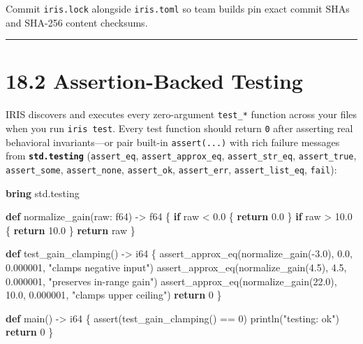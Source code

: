 \documentclass[
  english,
  oneside]{book}
\newenvironment{Shaded}{\begin{snugshade}}{\end{snugshade}}
\newcommand{\ControlFlowTok}[1]{\textcolor[rgb]{0.77,0.53,0.75}{\textbf{#1}}}
\newcommand{\DataTypeTok}[1]{\textcolor[rgb]{0.31,0.79,0.69}{#1}}
\newcommand{\DecValTok}[1]{\textcolor[rgb]{0.71,0.81,0.66}{#1}}
\newcommand{\FloatTok}[1]{\textcolor[rgb]{0.71,0.81,0.66}{#1}}
\newcommand{\FunctionTok}[1]{\textcolor[rgb]{0.86,0.86,0.67}{#1}}
\newcommand{\KeywordTok}[1]{\textcolor[rgb]{0.34,0.61,0.84}{\textbf{#1}}}
\newcommand{\NormalTok}[1]{\textcolor[rgb]{0.83,0.83,0.83}{#1}}
\newcommand{\OperatorTok}[1]{\textcolor[rgb]{0.83,0.83,0.83}{#1}}
\newcommand{\StringTok}[1]{\textcolor[rgb]{0.81,0.57,0.47}{#1}}
\newcounter{none} %
\begin{document}
Commit \texttt{iris.lock} alongside \texttt{iris.toml} so team builds
pin exact commit SHAs and SHA-256 content checksums.

\begin{center}\rule{0.5\linewidth}{0.5pt}\end{center}

\section{18.2 Assertion-Backed Testing}\label{assertion-backed-testing}

IRIS discovers and executes every zero-argument \texttt{test\_*}
function across your files when you run \texttt{iris\ test}. Every test
function should return \texttt{0} after asserting real behavioral
invariants---or pair built-in \texttt{assert(...)} with rich failure
messages from \textbf{\texttt{std.testing}} (\texttt{assert\_eq},
\texttt{assert\_approx\_eq}, \texttt{assert\_str\_eq},
\texttt{assert\_true}, \texttt{assert\_some}, \texttt{assert\_none},
\texttt{assert\_ok}, \texttt{assert\_err}, \texttt{assert\_list\_eq},
\texttt{fail}):

\begin{Shaded}
\begin{Highlighting}[]
\KeywordTok{bring}\NormalTok{ std}\OperatorTok{.}\NormalTok{testing}

\KeywordTok{def}\NormalTok{ normalize\_gain(raw: }\DataTypeTok{f64}\NormalTok{) }\OperatorTok{{-}\textgreater{}} \DataTypeTok{f64}\NormalTok{ \{}
    \ControlFlowTok{if}\NormalTok{ raw }\OperatorTok{\textless{}} \FloatTok{0.0}\NormalTok{ \{}
        \ControlFlowTok{return} \FloatTok{0.0}
\NormalTok{    \}}
    \ControlFlowTok{if}\NormalTok{ raw }\OperatorTok{\textgreater{}} \FloatTok{10.0}\NormalTok{ \{}
        \ControlFlowTok{return} \FloatTok{10.0}
\NormalTok{    \}}
    \ControlFlowTok{return}\NormalTok{ raw}
\NormalTok{\}}

\KeywordTok{def}\NormalTok{ test\_gain\_clamping() }\OperatorTok{{-}\textgreater{}} \DataTypeTok{i64}\NormalTok{ \{}
\NormalTok{    assert\_approx\_eq(normalize\_gain(}\OperatorTok{{-}}\FloatTok{3.0}\NormalTok{), }\FloatTok{0.0}\NormalTok{, }\FloatTok{0.000001}\NormalTok{, }\StringTok{"clamps negative input"}\NormalTok{)}
\NormalTok{    assert\_approx\_eq(normalize\_gain(}\FloatTok{4.5}\NormalTok{), }\FloatTok{4.5}\NormalTok{, }\FloatTok{0.000001}\NormalTok{, }\StringTok{"preserves in{-}range gain"}\NormalTok{)}
\NormalTok{    assert\_approx\_eq(normalize\_gain(}\FloatTok{22.0}\NormalTok{), }\FloatTok{10.0}\NormalTok{, }\FloatTok{0.000001}\NormalTok{, }\StringTok{"clamps upper ceiling"}\NormalTok{)}
    \ControlFlowTok{return} \DecValTok{0}
\NormalTok{\}}

\KeywordTok{def}\NormalTok{ main() }\OperatorTok{{-}\textgreater{}} \DataTypeTok{i64}\NormalTok{ \{}
    \FunctionTok{assert}\NormalTok{(test\_gain\_clamping() }\OperatorTok{==} \DecValTok{0}\NormalTok{)}
\NormalTok{    println(}\StringTok{"testing: ok"}\NormalTok{)}
    \ControlFlowTok{return} \DecValTok{0}
\NormalTok{\}}
\end{Highlighting}
\end{Shaded}
\end{document}
